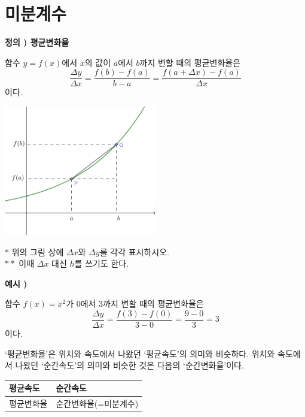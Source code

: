 \documentclass{oblivoir}
\newcounter{num}
\newcommand\defi[1]
{\bigskip\par\noindent\stepcounter{num} \textbf{정의 \thenum) #1}\par\noindent}
\newcommand\exam[1]
{\bigskip\par\noindent\stepcounter{num} \textbf{예시 \thenum) #1}\par\noindent}
\let\oldsection\section
\renewcommand\section{\clearpage\oldsection}
\let\emph\textsf
\begin{document}
\section{미분계수}
\begin{mdframed}
%
\defi{평균변화율}
함수 \(y=f(x)\)에서 \(x\)의 값이 \(a\)에서 \(b\)까지 변할 때의 \emph{평균변화율}은
\[\frac{\Delta y}{\Delta x}=\frac{f(b)-f(a)}{b-a}=\frac{f(a+\Delta x)-f(a)}{\Delta x}\]
이다.
\begin{center}
\includegraphics[width=0.5\textwidth]{average_rate_of_change}
\end{center}
\end{mdframed}
\(*\) 위의 그림 상에 \(\Delta x\)와 \(\Delta y\)를 각각 표시하시오.\\
\(**\) 이때 \(\Delta x\) 대신 \(h\)를 쓰기도 한다.
\bigskip

%
\exam{}
함수 \(f(x)=x^2\)가 \(0\)에서 \(3\)까지 변할 때의 평균변화율은
\[
\frac{\Delta y}{\Delta x}=\frac{f(3)-f(0)}{3-0}=\frac{9-0}{3}=3
\]
이다.

\bigskip
`평균변화율'은 위치와 속도에서 나왔던 `평균속도'의 의미와 비슷하다.
위치와 속도에서 나왔던 `순간속도'의 의미와 비슷한 것은 다음의 `순간변화율'이다.

\begin{center}
\begin{tabu}spread 0pt {|X[c]|X[c]|}\hline
평균속도	&순간속도\\\hline
평균변화율	&순간변화율(=미분계수)\\\hline
\end{tabu}
\end{center}
\end{document}
